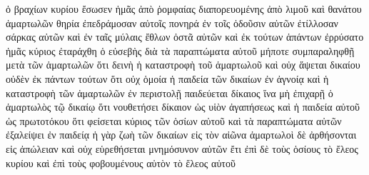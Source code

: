 ὁ βραχίων κυρίου ἔσωσεν ἡμᾶς ἀπὸ ῥομφαίας διαπορευομένης ἀπὸ λιμοῦ καὶ θανάτου ἁμαρτωλῶν
θηρία ἐπεδράμοσαν αὐτοῖς πονηρά ἐν τοῖς ὀδοῦσιν αὐτῶν ἐτίλλοσαν σάρκας αὐτῶν καὶ ἐν ταῖς μύλαις ἔθλων ὀστᾶ αὐτῶν
καὶ ἐκ τούτων ἁπάντων ἐρρύσατο ἡμᾶς κύριος
ἐταράχθη ὁ εὐσεβὴς διὰ τὰ παραπτώματα αὐτοῦ μήποτε συμπαραληφθῇ μετὰ τῶν ἁμαρτωλῶν
ὅτι δεινὴ ἡ καταστροφὴ τοῦ ἁμαρτωλοῦ καὶ οὐχ ἅψεται δικαίου οὐδὲν ἐκ πάντων τούτων
ὅτι οὐχ ὁμοία ἡ παιδεία τῶν δικαίων ἐν ἀγνοίᾳ καὶ ἡ καταστροφὴ τῶν ἁμαρτωλῶν
ἐν περιστολῇ παιδεύεται δίκαιος ἵνα μὴ ἐπιχαρῇ ὁ ἁμαρτωλὸς τῷ δικαίῳ
ὅτι νουθετήσει δίκαιον ὡς υἱὸν ἀγαπήσεως καὶ ἡ παιδεία αὐτοῦ ὡς πρωτοτόκου
ὅτι φείσεται κύριος τῶν ὁσίων αὐτοῦ καὶ τὰ παραπτώματα αὐτῶν ἐξαλείψει ἐν παιδείᾳ
ἡ γὰρ ζωὴ τῶν δικαίων εἰς τὸν αἰῶνα ἁμαρτωλοὶ δὲ ἀρθήσονται εἰς ἀπώλειαν καὶ οὐχ εὑρεθήσεται μνημόσυνον αὐτῶν ἔτι
ἐπὶ δὲ τοὺς ὁσίους τὸ ἔλεος κυρίου καὶ ἐπὶ τοὺς φοβουμένους αὐτὸν τὸ ἔλεος αὐτοῦ
